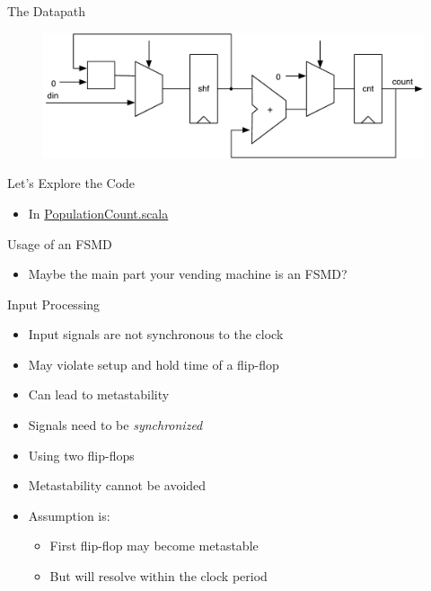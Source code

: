 \begin{frame}[fragile]{The Datapath}
\begin{figure}
  \includegraphics[scale=0.65]{../figures/popcnt-data}
\end{figure}
\end{frame}

\begin{frame}[fragile]{Let's Explore the Code}
\begin{itemize}
\item In \href{https://github.com/schoeberl/chisel-book/blob/master/src/main/scala/PopulationCount.scala}{PopulationCount.scala}
\end{itemize}
\end{frame}

\begin{frame}[fragile]{Usage of an FSMD}
\begin{itemize}
\item Maybe the main part your vending machine is an FSMD?
\end{itemize}
\end{frame}

\begin{frame}[fragile]{Input Processing}
\begin{itemize}
\item Input signals are not synchronous to the clock
\item May violate setup and hold time of a flip-flop
\item Can lead to metastability
\item Signals need to be \emph{synchronized}
\item Using two flip-flops
\item Metastability cannot be avoided
\item Assumption is:
\begin{itemize}
\item First flip-flop may become metastable
\item But will resolve within the clock period
\end{itemize}
\end{itemize}
\end{frame}

